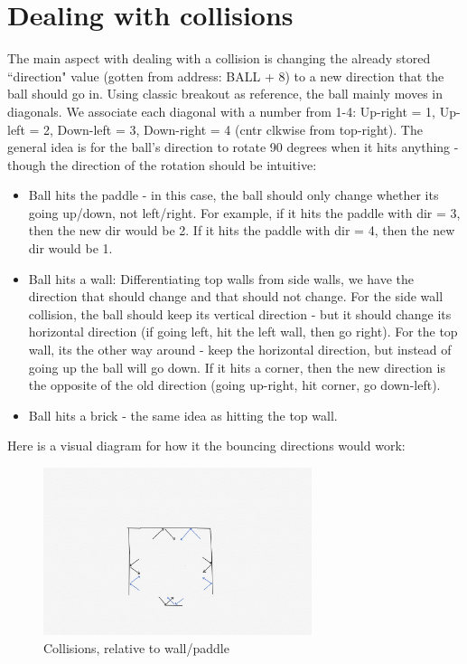 \documentclass{article}
\begin{document}
\section*{Dealing with collisions}
The main aspect with dealing with a collision is changing the already stored ``direction" value (gotten from address: BALL + 8)  to a new direction that the ball should go in. Using classic breakout as reference, the ball mainly moves in diagonals. We associate each diagonal with a number from 1-4: Up-right = 1, Up-left = 2, Down-left = 3, Down-right = 4 (cntr clkwise from top-right). The general idea is for the ball's direction to rotate 90 degrees when it hits anything - though the direction of the rotation should be intuitive:
\begin{itemize}
\item Ball hits the paddle - in this case, the ball should only change whether its going up/down, not left/right. For example, if it hits the paddle with dir = 3, then the new dir would be 2. If it hits the paddle with dir = 4, then the new dir would be 1.
\item Ball hits a wall: Differentiating top walls from side walls, we have the direction that should change and that should not change. For the side wall collision, the ball should keep its vertical direction  - but it should change its horizontal direction (if going left, hit the left wall, then go right). For the top wall, its the other way around - keep the horizontal direction, but instead of going up the ball will go down. If it hits a corner, then the new direction is the opposite of the old direction (going up-right, hit corner, go down-left).
\item Ball hits a brick - the same idea as hitting the top wall.
\end{itemize}
Here is a visual diagram for how it the bouncing directions would work:\begin{figure}[ht!]
    \centering
    \includegraphics[width=0.7\textwidth]{collisions.png}
    \caption{Collisions, relative to wall/paddle}
\end{figure}\\ 
\end{document}
